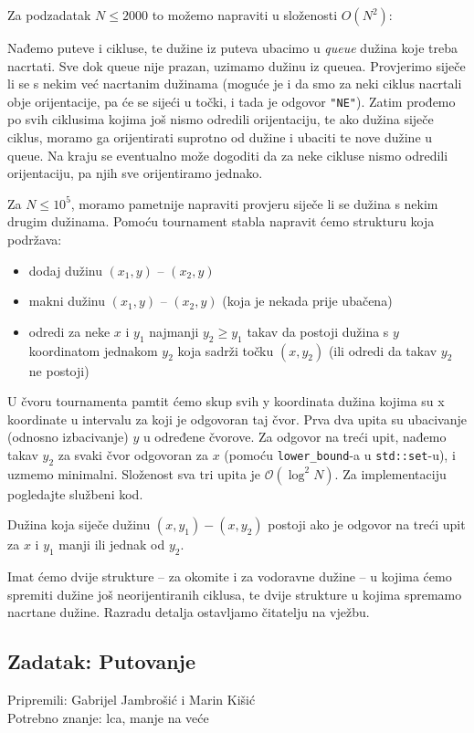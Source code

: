 \documentclass[a4paper]{article}
\begin{document}
Za podzadatak $N \leq 2000$ to možemo napraviti u složenosti $O(N^2)$:

Nađemo puteve i cikluse, te dužine iz puteva ubacimo u \textit{queue} dužina koje treba
nacrtati. Sve dok queue nije prazan, uzimamo dužinu iz queuea. Provjerimo
siječe li se s nekim već nacrtanim dužinama (moguće je i da smo za neki ciklus
nacrtali obje orijentacije, pa će se sijeći u točki, i tada je odgovor \texttt{"NE"}).
Zatim prođemo po svih ciklusima kojima još nismo odredili orijentaciju, te ako
dužina siječe ciklus, moramo ga orijentirati suprotno od dužine i ubaciti te
nove dužine u queue. Na kraju se eventualno može dogoditi da za neke cikluse
nismo odredili orijentaciju, pa njih sve orijentiramo jednako.

Za $N \le 10^5$, moramo pametnije napraviti provjeru siječe li se dužina s nekim
drugim dužinama. Pomoću tournament stabla napravit ćemo strukturu koja podržava:

\begin{itemize}
  \item dodaj dužinu $(x_1, y)$ -- $(x_2, y)$
  \item makni dužinu $(x_1, y)$ -- $(x_2, y)$ (koja je nekada prije ubačena)
  \item odredi za neke $x$ i $y_1$ najmanji $y_2 \ge y_1$ takav da postoji
    dužina s $y$ koordinatom jednakom $y_2$ koja sadrži točku $(x, y_2)$ (ili
    odredi da takav $y_2$ ne postoji)
\end{itemize}

U čvoru tournamenta pamtit ćemo skup svih y koordinata dužina kojima su x
koordinate u intervalu za koji je odgovoran taj čvor. Prva dva upita su
ubacivanje (odnosno izbacivanje) $y$ u određene čvorove. Za odgovor na treći
upit, nađemo takav $y_2$ za svaki čvor odgovoran za $x$ (pomoću
\texttt{lower\_bound}-a u \texttt{std::set}-u), i uzmemo minimalni. Složenost
sva tri upita je $\mathcal{O}(\log^2 N)$. Za implementaciju pogledajte
službeni kod.

Dužina koja siječe dužinu $(x, y_1) - (x, y_2)$ postoji ako je odgovor na treći
upit za $x$ i $y_1$ manji ili jednak od $y_2$.

Imat ćemo dvije strukture -- za okomite i za vodoravne dužine -- u kojima ćemo
spremiti dužine još neorijentiranih ciklusa, te dvije strukture u kojima
spremamo nacrtane dužine. Razradu detalja ostavljamo čitatelju na vježbu.

\subsection*{Zadatak: Putovanje}
\textsf{Pripremili: Gabrijel Jambrošić i Marin Kišić}\\
\textsf{Potrebno znanje: lca, manje na veće}
\end{document}
